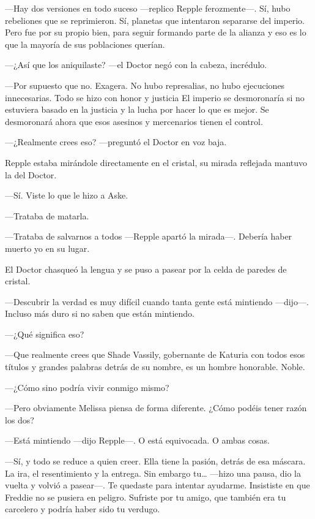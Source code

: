 {---Hay dos versiones en todo suceso ---replico Repple ferozmente---.
	Sí, hubo rebeliones que se reprimieron. Sí, planetas que intentaron
	separarse del imperio. Pero fue por su propio bien, para seguir formando
	parte de la alianza y eso es lo que la mayoría de sus poblaciones
querían.}

{---¿Así que los aniquilaste? ---el Doctor negó con la cabeza,
incrédulo.}

{---Por supuesto que no. Exagera. No hubo represalias, no hubo
	ejecuciones innecesarias. Todo se hizo con honor y justicia El imperio
	se desmoronaría si no estuviera basado en la justicia y la lucha por
	hacer lo que es mejor. Se desmoronará ahora que esos asesinos y
mercenarios tienen el control.}

{---¿Realmente crees eso? ---preguntó el Doctor en voz baja.}

{Repple estaba mirándole directamente en el cristal, su mirada reflejada
mantuvo la del Doctor.}

{---Sí. Viste lo que le hizo a Aske.}

{---Trataba de matarla.}

{---Trataba de salvarnos a todos ---Repple apartó la mirada---. Debería
haber muerto yo en su lugar.}

{El Doctor chasqueó la lengua y se puso a pasear por la celda de paredes
de cristal.}

{---Descubrir la verdad es muy difícil cuando tanta gente está mintiendo
---dijo---. Incluso más duro si no saben que están mintiendo.}

{---¿Qué significa eso?}

{---Que realmente crees que Shade Vassily, gobernante de Katuria con
	todos esos títulos y grandes palabras detrás de su nombre, es un hombre
honorable. Noble.}

{---¿Cómo sino podría vivir conmigo mismo?}

{---Pero obviamente Melissa piensa de forma diferente. ¿Cómo podéis
tener razón los dos?}

{---Está mintiendo ---dijo Repple---. O está equivocada. O ambas cosas.}

{---Sí, y todo se reduce a quien creer. Ella tiene la pasión, detrás de
	esa máscara. La ira, el resentimiento y la entrega. Sin embargo
	tu\ldots{} ---hizo una pausa, dio la vuelta y volvió a pasear---. Te
	quedaste para intentar ayudarme. Insististe en que Freddie no se pusiera
	en peligro. Sufriste por tu amigo, que también era tu carcelero y podría
haber sido tu verdugo.}

